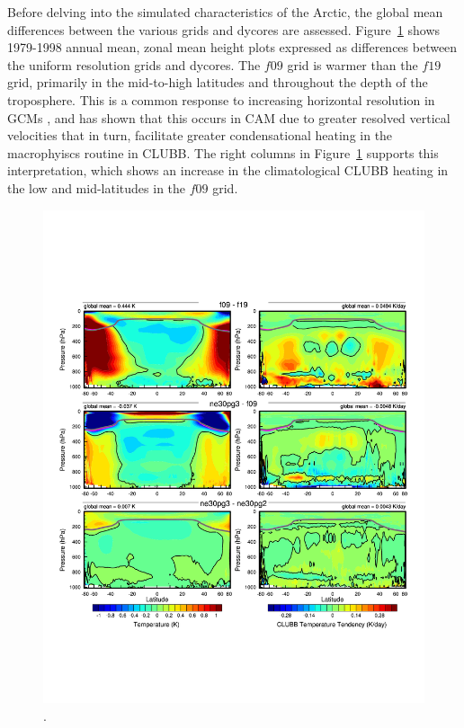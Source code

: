 \documentclass[draft]{agujournal2019}
\begin{document}
Before delving into the simulated characteristics of the Arctic, the global mean differences between the various grids and dycores are assessed. Figure~\ref{fig:dT-lores} shows 1979-1998 annual mean, zonal mean height plots expressed as differences between the uniform resolution grids and dycores. The $f09$ grid is warmer than the $f19$ grid, primarily in the mid-to-high latitudes and throughout the depth of the troposphere. This is a common response to increasing horizontal resolution in GCMs \cite{PS2002CD,RETAL2006JC}, and \cite{HK2020QJRMS} has shown that this occurs in CAM due to greater resolved vertical velocities that in turn, facilitate greater condensational heating in the macrophyiscs routine in CLUBB. The right columns in Figure~\ref{fig:dT-lores} supports this interpretation, which shows an increase in the climatological CLUBB heating in the low and mid-latitudes in the $f09$ grid. 

\begin{figure}[t]
\begin{center}
         \includegraphics[width=130mm]{figs/temp_dhgt_panel_STEND_CLUBB-lores.pdf}
\end{center}
\caption{.}
\label{fig:dT-lores}
\end{figure}
\end{document}
